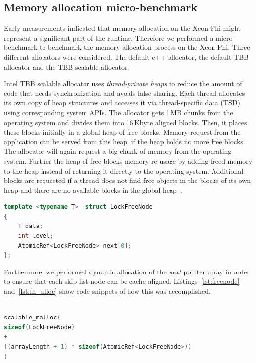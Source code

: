 \subsection{Memory allocation micro-benchmark}
Early measurements indicated that memory allocation on the Xeon Phi might represent a significant part of the runtime. Therefore we performed a micro-benchmark to benchmark the memory allocation process on the Xeon Phi. Three different allocators were considered. The default c++ allocator, the default TBB allocator and the TBB scalable allocator. 

Intel TBB scalable allocator uses \textit{thread-private heaps} to reduce the amount of code that needs synchronization and avoids false sharing. Each thread allocates its own copy of heap structures and accesses it via thread-specific data (TSD) using corresponding system APIs.
The allocator gets 1\,MB chunks from the operating system and divides them into 16\,Kbyte aligned blocks. Then, it places these blocks initially in a global heap of free blocks. Memory request from the application can be served from this heap, if the heap holds no more free blocks. The allocator will again request a big chunk of memory from the operating system. Further the heap of free blocks memory re-usage by adding freed memory to the heap instead of returning it directly to the operating system. Additional blocks are requested if a thread does not find free objects in the blocks of its own heap and there are no available blocks in the global heap~\cite{_thefoundations,Hudson:2006:MST:1133956.1133967}. %

\begin{lstlisting}[language=C++,basicstyle=\tt\scriptsize,captionpos=b,caption=Lock free node structure,label=lst:freenode,morekeywords={*, size_t}]
template <typename T>  struct LockFreeNode
{	
	T data;
	int	level;
	AtomicRef<LockFreeNode>	next[0];
};
\end{lstlisting}

Furthermore, we performed dynamic allocation of the {\em next} pointer array in order to ensure that each skip list node can be cache-aligned. Listings~\ref{lst:freenode} and~\ref{lst:fn_alloc} show code snippets of how this was accomplished.
\begin{lstlisting}[language=C++,basicstyle=\tt\scriptsize,captionpos=b,caption=Memory allocation instruction for array of atomic references,label=lst:fn_alloc, morekeywords={*, size_t}]

scalable_malloc(
sizeof(LockFreeNode) 
+ 
((arrayLength + 1) * sizeof(AtomicRef<LockFreeNode>))
)
\end{lstlisting}

